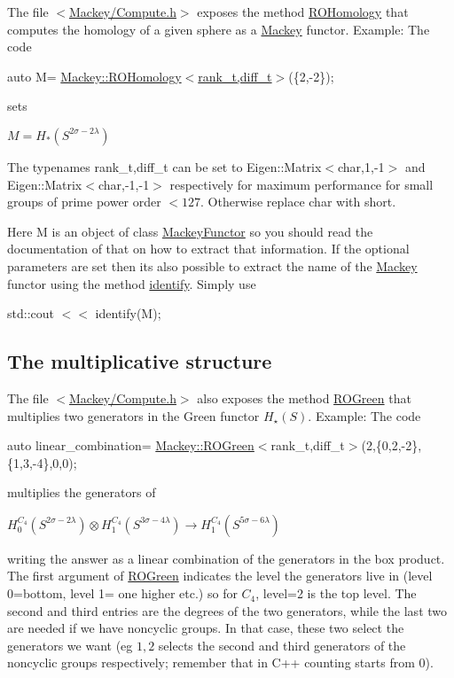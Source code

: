 The file {\ttfamily $<$\hyperlink{Compute_8h}{Mackey/\+Compute.\+h}$>$} exposes the method \hyperlink{namespaceMackey_a58708ee937b0c4172b7cde8e5f856504}{R\+O\+Homology} that computes the homology of a given sphere as a \hyperlink{namespaceMackey}{Mackey} functor. Example\+: The code

{\ttfamily  auto M= \hyperlink{namespaceMackey_a58708ee937b0c4172b7cde8e5f856504}{Mackey\+::\+R\+O\+Homology$<$rank\+\_\+t,diff\+\_\+t$>$}(\{2,-\/2\}); }

sets

$ M=H_*(S^{2\sigma-2\lambda})$

The typenames {\ttfamily rank\+\_\+t,diff\+\_\+t} can be set to {\ttfamily Eigen\+::\+Matrix$<$char,1,-\/1$>$} and {\ttfamily Eigen\+::\+Matrix$<$char,-\/1,-\/1$>$} respectively for maximum performance for small groups of prime power order $ <127 $. Otherwise replace {\ttfamily char} with {\ttfamily short}.

Here {\ttfamily M} is an object of class \hyperlink{classMackey_1_1MackeyFunctor}{Mackey\+Functor} so you should read the documentation of that on how to extract that information. If the optional parameters are set then it\textquotesingle{}s also possible to extract the name of the \hyperlink{namespaceMackey}{Mackey} functor using the method \hyperlink{namespaceMackey_a216f2d9a39510ce4513d5d8a576adc43}{identify}. Simply use

{\ttfamily  std\+::cout $<$$<$ identify(\+M); }\hypertarget{use_step1mult}{}\subsection{The multiplicative structure}\label{use_step1mult}
The file {\ttfamily $<$\hyperlink{Compute_8h}{Mackey/\+Compute.\+h}$>$} also exposes the method \hyperlink{namespaceMackey_a2bd86833844ca62d76c47a54aeb0bb77}{R\+O\+Green} that multiplies two generators in the Green functor $H_{\star}(S)$. Example\+: The code

{\ttfamily auto linear\+\_\+combination= \hyperlink{namespaceMackey_a2bd86833844ca62d76c47a54aeb0bb77}{Mackey\+::\+R\+O\+Green}$<$rank\+\_\+t,diff\+\_\+t$>$(2,\{0,2,-\/2\},\{1,3,-\/4\},0,0);}

multiplies the generators of

$ H_0^{C_4}(S^{2\sigma-2\lambda}) \otimes H_1^{C_4}(S^{3\sigma-4\lambda}) \to H_1^{C_4}(S^{5\sigma-6\lambda}) $

writing the answer as a linear combination of the generators in the box product. The first argument of \hyperlink{namespaceMackey_a2bd86833844ca62d76c47a54aeb0bb77}{R\+O\+Green} indicates the level the generators live in (level 0=bottom, level 1= one higher etc.) so for $C_4$, level=2 is the top level. The second and third entries are the degrees of the two generators, while the last two are needed if we have noncyclic groups. In that case, these two select the generators we want (eg $1,2$ selects the second and third generators of the noncyclic groups respectively; remember that in C++ counting starts from $0$).

